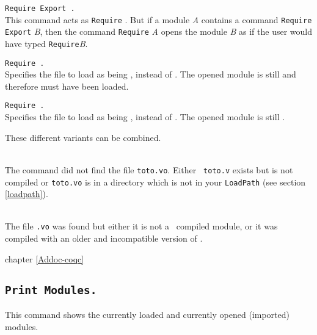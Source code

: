 \begin{Variants}
\item {\tt Require Export {\ident}.}\\
  This command acts as {\tt Require} {\ident}.  But if a module {\it
    A} contains a command {\tt Require Export} {\it B}, then the
  command {\tt Require} {\it A} opens the module {\it B} as if the
  user would have typed {\tt Require}{\it B}.
\item {\tt Require {\ident} {\str}.}\\ 
  Specifies the file to load as being {\str}, instead of
  {\ident}. The opened module is still {\ident} and therefore
  must have been loaded.
\item {\tt Require {\ident} {\str}.}\\ 
  Specifies the file to load as being {\str}, instead of
  {\ident}. The opened module is still {\ident}.
\end{Variants}

These different variants can be combined.

\begin{ErrMsgs}
\item {}\\
  The command did not find the file {\tt toto.vo}. Either {\tt
    toto.v} exists but is not compiled or {\tt toto.vo} is in a directory
  which is not in your {\tt LoadPath} (see section \ref{loadpath}).
\item {}\\
  The file {\tt{\ident}.vo} was found but either it is not a \Coq\
  compiled module, or it was compiled with an older and incompatible
  version of \Coq.
\end{ErrMsgs}

\SeeAlso chapter \ref{Addoc-coqc}

\subsection{\tt Print Modules.}
This command shows the currently loaded and currently opened
(imported) modules.

